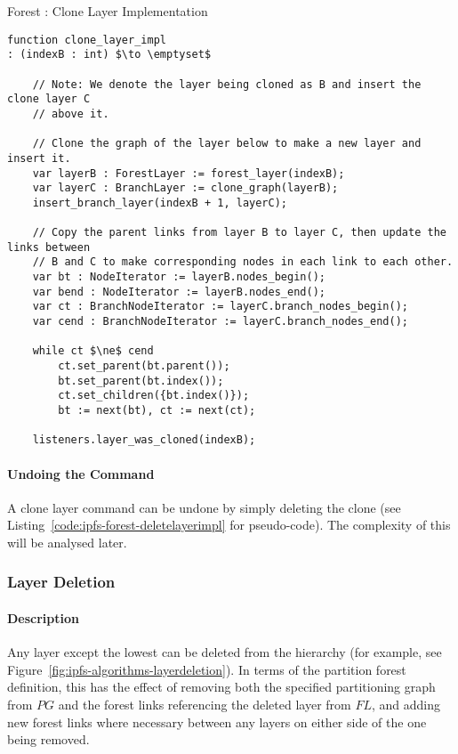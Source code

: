 \begin{stulisting}[p]
\caption{Forest : Clone Layer Implementation}
\label{code:ipfs-forest-clonelayerimpl}
\begin{lstlisting}[style=Default]
function clone_layer_impl
: (indexB : int) $\to \emptyset$

	// Note: We denote the layer being cloned as B and insert the clone layer C
	// above it.

	// Clone the graph of the layer below to make a new layer and insert it.
	var layerB : ForestLayer := forest_layer(indexB);
	var layerC : BranchLayer := clone_graph(layerB);
	insert_branch_layer(indexB + 1, layerC);

	// Copy the parent links from layer B to layer C, then update the links between
	// B and C to make corresponding nodes in each link to each other.
	var bt : NodeIterator := layerB.nodes_begin();
	var bend : NodeIterator := layerB.nodes_end();
	var ct : BranchNodeIterator := layerC.branch_nodes_begin();
	var cend : BranchNodeIterator := layerC.branch_nodes_end();

	while ct $\ne$ cend
		ct.set_parent(bt.parent());
		bt.set_parent(bt.index());
		ct.set_children({bt.index()});
		bt := next(bt), ct := next(ct);

	listeners.layer_was_cloned(indexB);
\end{lstlisting}
\end{stulisting}

\paragraph{Undoing the Command}

A clone layer command can be undone by simply deleting the clone (see Listing~\ref{code:ipfs-forest-deletelayerimpl} for pseudo-code). The complexity of this will be analysed later.

\subsubsection{Layer Deletion}

\paragraph{Description}

Any layer except the lowest can be deleted from the hierarchy (for example, see Figure~\ref{fig:ipfs-algorithms-layerdeletion}). In terms of the partition forest definition, this has the effect of removing both the specified partitioning graph from $\textit{PG}$ and the forest links referencing the deleted layer from $\textit{FL}$, and adding new forest links where necessary between any layers on either side of the one being removed.

